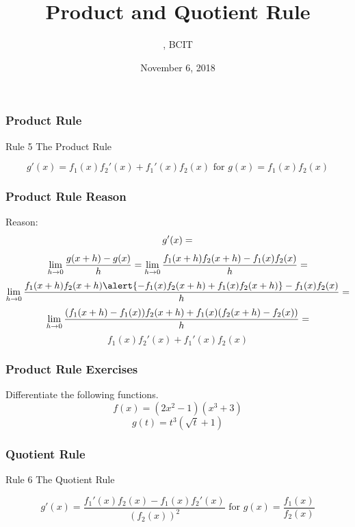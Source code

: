 \documentclass[xcolor=dvipsnames]{beamer}
\title{Product and Quotient Rule}
\subtitle{{\CourseNumber}, BCIT}
\author{\CourseName}
\date{November 6, 2018}
\begin{document}
\begin{frame}
  \titlepage
\end{frame}

\begin{frame}
  \frametitle{Product Rule}
  \begin{block}{Rule 5}
The Product Rule
  \end{block}
\begin{equation}
  \label{eq:aepuaxai}
g'(x)=f_{1}(x)f_{2}'(x)+f_{1}'(x)f_{2}(x)\mbox{ for }g(x)=f_{1}(x)f_{2}(x)
\end{equation}
\end{frame}

\begin{frame}
  \frametitle{Product Rule Reason}
Reason:
\begin{equation}
  \label{eq:yahtiera}
g'(x)=\notag
\end{equation}
\begin{equation}
  \label{eq:piebaith}
\lim_{h\rightarrow{}0}\frac{g(x+h)-g(x)}{h}=\lim_{h\rightarrow{}0}\frac{f_{1}(x+h)f_{2}(x+h)-f_{1}(x)f_{2}(x)}{h}=\notag
\end{equation}
\begin{equation}
  \label{eq:eceishie}
\lim_{h\rightarrow{}0}\frac{f_{1}(x+h)f_{2}(x+h)\alert{-f_{1}(x)f_{2}(x+h)+f_{1}(x)f_{2}(x+h)}-f_{1}(x)f_{2}(x)}{h}=\notag
\end{equation}
\begin{equation}
  \label{eq:chiekeey}
\lim_{h\rightarrow{}0}\frac{(f_{1}(x+h)-f_{1}(x))f_{2}(x+h)+f_{1}(x)(f_{2}(x+h)-f_{2}(x))}{h}=\notag
\end{equation}
\begin{equation}
  \label{eq:vaeyiewe}
f_{1}(x)f_{2}'(x)+f_{1}'(x)f_{2}(x)
\end{equation}
\end{frame}

\begin{frame}
  \frametitle{Product Rule Exercises}
{\ubung} Differentiate the following functions.
\begin{equation}
  \label{eq:iefeiwah}
f(x)=(2x^{2}-1)(x^{3}+3)
\end{equation}
\begin{equation}
  \label{eq:recootie}
g(t)=t^{3}\left(\sqrt{t}+1\right)
\end{equation}
\end{frame}

\begin{frame}
  \frametitle{Quotient Rule}
  \begin{block}{Rule 6}
The Quotient Rule
  \end{block}
\begin{equation}
  \label{eq:roothubu}
g'(x)=\frac{f_{1}'(x)f_{2}(x)-f_{1}(x)f_{2}'(x)}{\left(f_{2}(x)\right)^{2}}\mbox{ for }g(x)=\frac{f_{1}(x)}{f_{2}(x)}
\end{equation}
\end{frame}
\end{document}
